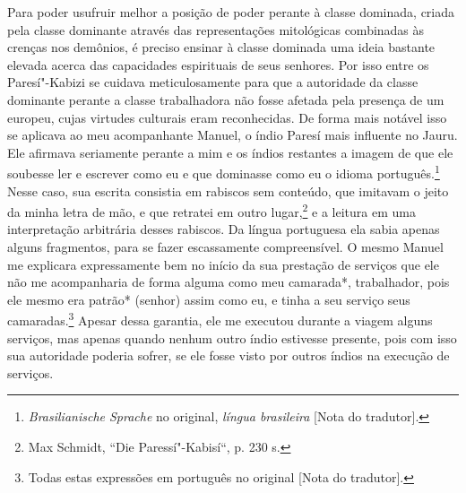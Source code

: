 Para poder usufruir melhor a posição de poder perante à classe dominada,
criada pela classe dominante através das representações mitológicas
combinadas às crenças nos demônios, é preciso ensinar à classe dominada
uma ideia bastante elevada acerca das capacidades espirituais de seus
senhores. Por isso entre os Paresí"-Kabizi se cuidava meticulosamente
para que a autoridade da classe dominante perante a classe trabalhadora
não fosse afetada pela presença de um europeu, cujas virtudes culturais
eram reconhecidas. De forma mais notável isso se aplicava ao meu
acompanhante Manuel, o índio Paresí mais influente no Jauru. Ele
afirmava seriamente perante a mim e os índios restantes a imagem de que
ele soubesse ler e escrever como eu e que dominasse como eu o idioma
português.\footnote[*]{\emph{Brasilianische Sprache} no original, \emph{língua
  brasileira} {[}Nota do tradutor{]}.} Nesse caso, sua escrita consistia em rabiscos sem conteúdo,
que imitavam o jeito da minha letra de mão, e que retratei em outro
lugar,\footnote{Max Schmidt, ``Die Paressí"-Kabisí``, p. 230 s.} e a leitura em uma interpretação arbitrária desses
rabiscos. Da língua portuguesa ela sabia apenas alguns fragmentos, para
se fazer escassamente compreensível. O mesmo Manuel me explicara
expressamente bem no início da sua prestação de serviços que ele não me
acompanharia de forma alguma como meu camarada*, trabalhador, pois ele
mesmo era patrão* (senhor) assim como eu, e tinha a seu serviço seus
camaradas.\footnote[*]{Todas estas expressões em português no original {[}Nota do
  tradutor{]}.} Apesar dessa garantia, ele me executou durante a viagem
alguns serviços, mas apenas quando nenhum outro índio estivesse
presente, pois com isso sua autoridade poderia sofrer, se ele fosse
visto por outros índios na execução de serviços.

